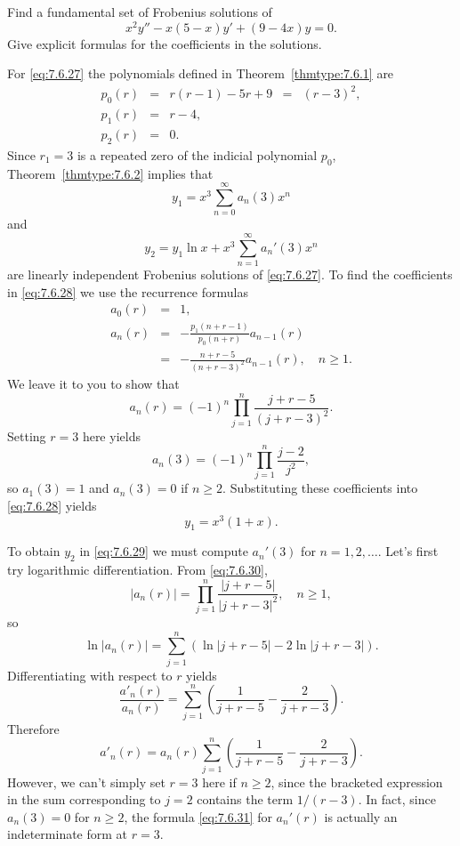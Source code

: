 \documentclass{ximera}
\begin{document}
\begin{example}\label{example:7.6.4}
Find a fundamental set of Frobenius solutions of
\begin{equation} \label{eq:7.6.27}
x^2y''-x(5-x)y'+(9-4x)y=0.
\end{equation}
Give explicit formulas for the coefficients in the solutions.

\begin{explanation}
For \eqref{eq:7.6.27} the polynomials defined in Theorem~\ref{thmtype:7.6.1}
are
$$
\begin{array}{cclcc}
p_0(r)&=&r(r-1)-5r+9&=&(r-3)^2,\\
p_1(r)&=&r-4,\\
p_2(r)&=&0.
\end{array}
$$
Since $r_1=3$ is a repeated zero of the  indicial polynomial $p_0$,
Theorem~\ref{thmtype:7.6.2} implies that
\begin{equation} \label{eq:7.6.28}
y_1=x^3\sum_{n=0}^\infty  a_n(3)x^n
\end{equation}
and
\begin{equation} \label{eq:7.6.29}
y_2=y_1\ln x+x^3\sum_{n=1}^\infty a_n'(3)x^n
\end{equation}
are linearly independent Frobenius solutions of \eqref{eq:7.6.27}.
To find the coefficients in \eqref{eq:7.6.28} we use the recurrence
formulas
$$
\begin{array}{ccl}
a_0(r)&=&1,\\
a_n(r)&=&-\frac{p_1(n+r-1)}{p_0(n+r)}a_{n-1}(r)\\
&=&-\frac{n+r-5}{(n+r-3)^2}a_{n-1}(r),\quad n\geq 1.
\end{array}
$$
We leave it to you to show that
\begin{equation} \label{eq:7.6.30}
a_n(r)=(-1)^n\prod_{j=1}^n\frac{j+r-5}{(j+r-3)^2}.
\end{equation}
Setting $r=3$ here yields
$$
a_n(3)=(-1)^n\prod_{j=1}^n\frac{j-2}{j^2},
$$
so  $a_1(3)=1$ and $a_n(3)=0$ if $n\ge2$. Substituting
these coefficients into \eqref{eq:7.6.28} yields
$$
y_1=x^3(1+x).
$$

To obtain $y_2$ in \eqref{eq:7.6.29} we must compute $a_n'(3)$
for $n=1, 2, \dots$.
 Let's first try  logarithmic differentiation.
From \eqref{eq:7.6.30},
$$
|a_n(r)|=\prod_{j=1}^n\frac{|j+r-5|}{|j+r-3|^2},\quad n\geq 1,
$$
so
$$
\ln |a_n(r)|=\sum^n_{j=1} \left(\ln |j+r-5|-2\ln|j+r-3|\right).
$$
Differentiating  with respect to $r$ yields
$$
\frac{a'_n(r)}{a_n(r)}=\sum^n_{j=1} \left(\frac{1}{j+r-5}-\frac{2}{j+r-3}\right).
$$
Therefore
\begin{equation} \label{eq:7.6.31}
a'_n(r)=a_n(r) \sum^n_{j=1} \left(\frac{1}{j+r-5}-\frac{2}{j+r-3}\right).
\end{equation}
However, we can't simply set $r=3$ here if $n\ge2$,  since the bracketed
expression in the sum corresponding to  $j=2$ contains the term $1/(r-3)$.
In fact, since $a_n(3)=0$ for $n\ge2$, the  formula \eqref{eq:7.6.31} for
$a_n'(r)$ is actually an indeterminate form at $r=3$.


\end{explanation}
\end{example}
\end{document}
